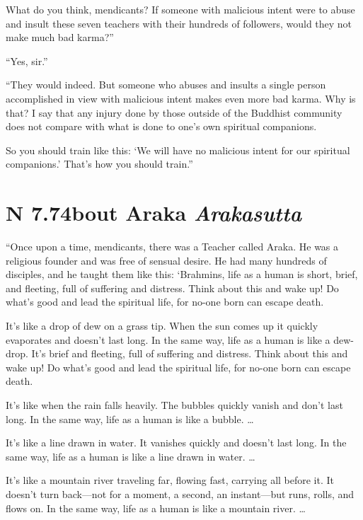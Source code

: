 \documentclass[12pt,openany]{book}%
\newcommand*{\suttatitleacronym}[1]{\smaller[2]{#1}\vspace*{.3em}}
\newcommand*{\suttatitletranslation}[1]{\linebreak{#1}}
\newcommand*{\suttatitleroot}[1]{\linebreak\smaller[2]\itshape{#1}}
\newcommand*{\tocacronym}[1]{\hspace*{-3.3em}{#1}\quad}
\newcommand*{\toctranslation}[1]{#1}
\newcommand*{\tocroot}[1]{(\textit{#1})}
\begin{document}
What do you think, mendicants? If someone with malicious intent were to abuse and insult these seven teachers with their hundreds of followers, would they not make much bad karma?” 

“Yes, sir.” 

“They would indeed. But someone who abuses and insults a single person accomplished in view with malicious intent makes even more bad karma. Why is that? I say that any injury done by those outside of the Buddhist community does not compare with what is done to one’s own spiritual companions. 

So you should train like this: ‘We will have no malicious intent for our spiritual companions.’ That’s how you should train.” 

%
\section*{{\suttatitleacronym AN 7.74}{\suttatitletranslation About Araka }{\suttatitleroot Arakasutta}}
\addcontentsline{toc}{section}{\tocacronym{AN 7.74} \toctranslation{About Araka } \tocroot{Arakasutta}}

“Once upon a time, mendicants, there was a Teacher called Araka. He was a religious founder and was free of sensual desire. He had many hundreds of disciples, and he taught them like this: ‘Brahmins, life as a human is short, brief, and fleeting, full of suffering and distress. Think about this and wake up! Do what’s good and lead the spiritual life, for no-one born can escape death. 

It’s like a drop of dew on a grass tip. When the sun comes up it quickly evaporates and doesn’t last long. In the same way, life as a human is like a dew-drop. It’s brief and fleeting, full of suffering and distress. Think about this and wake up! Do what’s good and lead the spiritual life, for no-one born can escape death. 

It’s like when the rain falls heavily. The bubbles quickly vanish and don’t last long. In the same way, life as a human is like a bubble. … 

It’s like a line drawn in water. It vanishes quickly and doesn’t last long. In the same way, life as a human is like a line drawn in water. … 

It’s like a mountain river traveling far, flowing fast, carrying all before it. It doesn’t turn back—not for a moment, a second, an instant—but runs, rolls, and flows on. In the same way, life as a human is like a mountain river. … 
\end{document}
